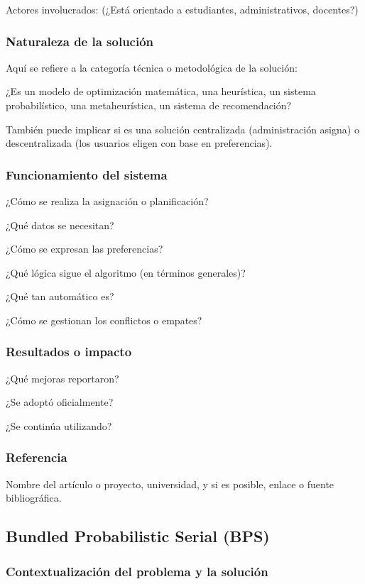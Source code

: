\documentclass{article}
\begin{document}
Actores involucrados: (¿Está orientado a estudiantes, administrativos, docentes?)

\subsubsection{Naturaleza de la solución}
Aquí se refiere a la categoría técnica o metodológica de la solución:

¿Es un modelo de optimización matemática, una heurística, un sistema probabilístico, una metaheurística, un sistema de recomendación?

También puede implicar si es una solución centralizada (administración asigna) o descentralizada (los usuarios eligen con base en preferencias).

\subsubsection{Funcionamiento del sistema}
¿Cómo se realiza la asignación o planificación?

¿Qué datos se necesitan?

¿Cómo se expresan las preferencias?

¿Qué lógica sigue el algoritmo (en términos generales)?

¿Qué tan automático es?

¿Cómo se gestionan los conflictos o empates?

\subsubsection{Resultados o impacto}
¿Qué mejoras reportaron?

¿Se adoptó oficialmente?

¿Se continúa utilizando?

\subsubsection{Referencia}
Nombre del artículo o proyecto, universidad, y si es posible, enlace o fuente bibliográfica.

\subsection{Bundled Probabilistic Serial (BPS)}

\subsubsection{Contextualización del problema y la solución}
\end{document}
